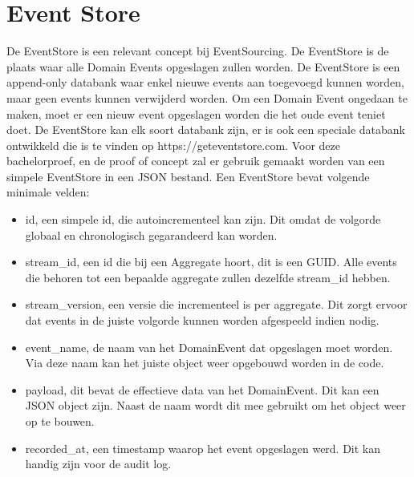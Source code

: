 
\section{Event Store}
\label{sec:event-store}

De EventStore is een relevant concept bij EventSourcing. De EventStore is de plaats waar alle Domain Events opgeslagen zullen worden. De EventStore is een append-only databank waar enkel nieuwe events aan toegevoegd kunnen worden, maar geen events kunnen verwijderd worden. Om een Domain Event ongedaan te maken, moet er een nieuw event opgeslagen worden die het oude event teniet doet. De EventStore kan elk soort databank zijn, er is ook een speciale databank ontwikkeld die is te vinden op https://geteventstore.com. Voor deze bachelorproef, en de proof of concept zal er gebruik gemaakt worden van een simpele EventStore in een \gls{JSON} bestand. Een EventStore bevat volgende minimale velden:

\begin{itemize}
  \item{id, een simpele id, die autoincrementeel kan zijn. Dit omdat de volgorde globaal en chronologisch gegarandeerd kan worden.}
  \item{stream_id, een id die bij een Aggregate hoort, dit is een \gls{GUID}. Alle events die behoren tot een bepaalde aggregate zullen dezelfde stream_id hebben.}
  \item{stream_version, een versie die incrementeel is per aggregate. Dit zorgt ervoor dat events in de juiste volgorde kunnen worden afgespeeld indien nodig.}
  \item{event_name, de naam van het DomainEvent dat opgeslagen moet worden. Via deze naam kan het juiste object weer opgebouwd worden in de code.}
  \item{payload, dit bevat de effectieve data van het DomainEvent. Dit kan een \gls{JSON} object zijn. Naast de naam wordt dit mee gebruikt om het object weer op te bouwen.}
  \item{recorded_at, een timestamp waarop het event opgeslagen werd. Dit kan handig zijn voor de audit log.}
\end{itemize}
